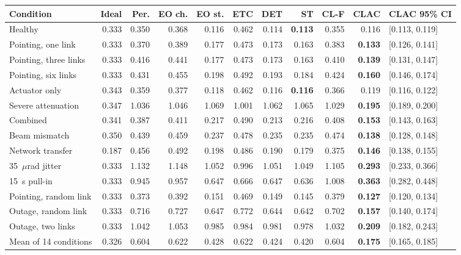 \begin{tabular}{@{}lrrrrrrrrr@{\,}l@{}}
\toprule
Condition & Ideal & Per. & EO ch. & EO st. & ETC & DET & ST & CL-F & CLAC & \multicolumn{1}{c}{CLAC 95\% CI}\\
\midrule
Healthy & 0.333 & 0.350 & 0.368 & 0.116 & 0.462 & 0.114 & \textbf{0.113} & 0.355 & 0.116 & [0.113, 0.119]\\
Pointing, one link & 0.333 & 0.370 & 0.389 & 0.177 & 0.473 & 0.173 & 0.163 & 0.383 & \textbf{0.133} & [0.126, 0.141]\\
Pointing, three links & 0.333 & 0.416 & 0.441 & 0.177 & 0.473 & 0.173 & 0.163 & 0.410 & \textbf{0.139} & [0.131, 0.147]\\
Pointing, six links & 0.333 & 0.431 & 0.455 & 0.198 & 0.492 & 0.193 & 0.184 & 0.424 & \textbf{0.160} & [0.146, 0.174]\\
Actuator only & 0.343 & 0.359 & 0.377 & 0.118 & 0.462 & 0.116 & \textbf{0.116} & 0.366 & 0.119 & [0.116, 0.122]\\
Severe attenuation & 0.347 & 1.036 & 1.046 & 1.069 & 1.001 & 1.062 & 1.065 & 1.029 & \textbf{0.195} & [0.189, 0.200]\\
Combined & 0.341 & 0.387 & 0.411 & 0.217 & 0.490 & 0.213 & 0.216 & 0.408 & \textbf{0.153} & [0.143, 0.163]\\
Beam mismatch & 0.350 & 0.439 & 0.459 & 0.237 & 0.478 & 0.235 & 0.235 & 0.474 & \textbf{0.138} & [0.128, 0.148]\\
Network transfer & 0.187 & 0.456 & 0.492 & 0.198 & 0.486 & 0.190 & 0.179 & 0.375 & \textbf{0.146} & [0.138, 0.155]\\
35~$\mu$rad jitter & 0.333 & 1.132 & 1.148 & 1.052 & 0.996 & 1.051 & 1.049 & 1.105 & \textbf{0.293} & [0.233, 0.366]\\
15~s pull-in & 0.333 & 0.945 & 0.957 & 0.647 & 0.666 & 0.647 & 0.636 & 1.008 & \textbf{0.363} & [0.282, 0.448]\\
Pointing, random link & 0.333 & 0.373 & 0.392 & 0.151 & 0.469 & 0.149 & 0.145 & 0.379 & \textbf{0.127} & [0.120, 0.134]\\
Outage, random link & 0.333 & 0.716 & 0.727 & 0.647 & 0.772 & 0.644 & 0.642 & 0.702 & \textbf{0.157} & [0.140, 0.174]\\
Outage, two links & 0.333 & 1.042 & 1.053 & 0.985 & 0.984 & 0.981 & 0.978 & 1.032 & \textbf{0.209} & [0.182, 0.243]\\
\midrule
Mean of 14 conditions & 0.326 & 0.604 & 0.622 & 0.428 & 0.622 & 0.424 & 0.420 & 0.604 & \textbf{0.175} & [0.165, 0.185]\\
\bottomrule
\end{tabular}
